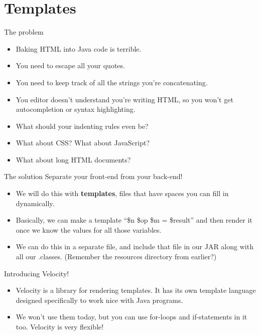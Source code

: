 \section{Templates}

\begin{frame}{The problem}
\begin{itemize}
    \item Baking HTML into Java code is terrible.
    \item You need to escape all your quotes.
    \item You need to keep track of all the strings you're concatenating.
    \item You editor doesn't understand you're writing HTML, so you won't get autocompletion or syntax highlighting.
    \item What should your indenting rules even be?
    \item What about CSS? What about JavaScript?
    \item What about long HTML documents?
\end{itemize}
\end{frame}

\begin{frame}{The solution}
Separate your front-end from your back-end!
\begin{itemize}
    \item We will do this with \textbf{templates}, files that have spaces you can fill in dynamically.
    \item Basically, we can make a template ``\$n \$op \$m = \$result'' and then render it once we know the values for all those variables.
    \item We can do this in a separate file, and include that file in our JAR along with all our .classes. (Remember the resources directory from earlier?)
\end{itemize}
\end{frame}

\begin{frame}{Introducing Velocity!}

\begin{center}

\end{center}
\begin{itemize}
    \item Velocity is a library for rendering templates. It has its own template language designed specifically to work nice with Java programs.
    \item We won't use them today, but you can use for-loops and if-statements in it too. Velocity is very flexible!
\end{itemize}
\end{frame}

